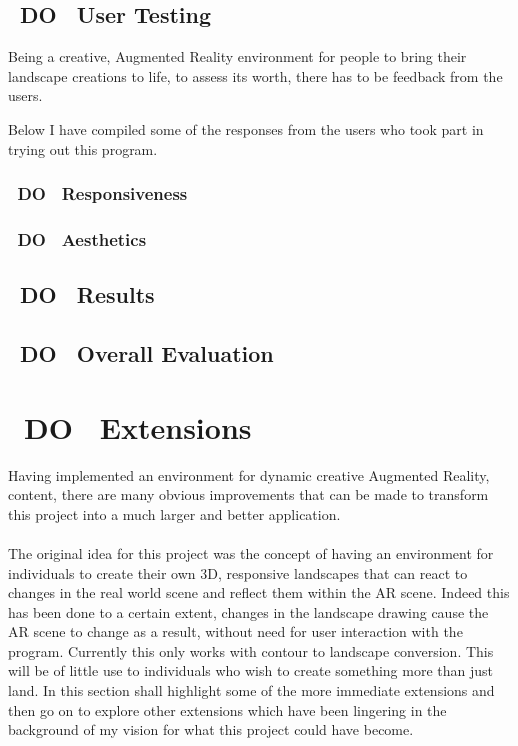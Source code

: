 \documentclass[11pt]{article}
\begin{document}
\subsection{~DO~ User Testing}
Being a creative, Augmented Reality environment for people to bring their 
landscape creations to life, to assess its worth, there has to be feedback
from the users.



Below I have compiled some of the responses from the users who took part in
trying out this program.
\subsubsection{~DO~ Responsiveness}

\subsubsection{~DO~ Aesthetics}

\subsection{~DO~ Results}

\subsection{~DO~ Overall Evaluation}

\section{~DO~ Extensions}
Having implemented an environment for dynamic creative Augmented Reality,
content, there are many obvious improvements that can be made to transform 
this project into a much larger and better application. \\
\\
The original idea for this project was the concept of having an environment
for individuals to create their own 3D, responsive landscapes that can react
to changes in the real world scene and reflect them within the AR scene. Indeed
this has been done to a certain extent, changes in the landscape drawing cause
the AR scene to change as a result, without need for user interaction with the
program. Currently this only works with contour to landscape conversion. This
will be of little use to individuals who wish to create something more than just
land. In this section shall highlight some of the more immediate extensions
and then go on to explore other extensions which have been lingering in the 
background of my vision for what this project could have become.
\end{document}
